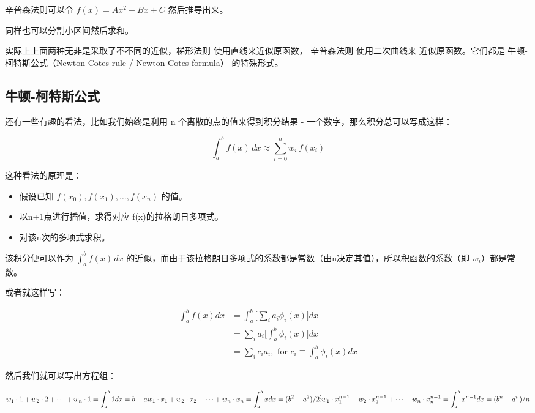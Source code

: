 \documentclass[
]{book}
\providecommand{\tightlist}{%
  \setlength{\itemsep}{0pt}\setlength{\parskip}{0pt}}
\begin{document}
辛普森法则可以令 \(f(x) = A x^2 + Bx + C\) 然后推导出来。

同样也可以分割小区间然后求和。

实际上上面两种无非是采取了不不同的近似，梯形法则 使用直线来近似原函数， 辛普森法则 使用二次曲线来 近似原函数。它们都是 牛顿-柯特斯公式（Newton-Cotes rule / Newton-Cotes formula） 的特殊形式。

\hypertarget{ux725bux987f-ux67efux7279ux65afux516cux5f0f}{%
\subsection{牛顿-柯特斯公式}\label{ux725bux987f-ux67efux7279ux65afux516cux5f0f}}

还有一些有趣的看法，比如我们始终是利用 n 个离散的点的值来得到积分结果 - 一个数字，那么积分总可以写成这样：

\[\int _{a}^{b}f(x)\,dx\approx \sum _{{i=0}}^{n}w_{i}\,f(x_{i})\]

这种看法的原理是：

\begin{itemize}
\tightlist
\item
  假设已知 \(f(x_{0}),f(x_{1}),\dots ,f(x_{n})\) 的值。
\item
  以n+1点进行插值，求得对应 f(x)的拉格朗日多项式。
\item
  对该n次的多项式求积。
\end{itemize}

该积分便可以作为 \(\int _{a}^{b}f(x)\,dx\) 的近似，而由于该拉格朗日多项式的系数都是常数（由n决定其值），所以积函数的系数（即 \(w_{i}\)）都是常数。

或者就这样写：

\[
\begin{aligned}
\int_a^b f(x)dx &= \int_a^b \bigg[ \sum_i a_i \phi_i(x)\bigg] dx  \\
&=\sum_i a_i \bigg[ \int_a^b  \phi_i(x)\bigg] dx\\
&= \sum_i c_i a_i, \text{ for } c_i \equiv \int_a^b \phi_i(x) dx
\end{aligned}
\]

然后我们就可以写出方程组：

\[
w_1 \cdot 1 + w_2 \cdot 2 + \cdots + w_n \cdot 1 = \int_a^b 1dx = b - a \\
w_1 \cdot x_1 + w_2 \cdot x_2 + \cdots + w_n \cdot x_n = \int_a^b xdx = (b^2 - a^2)/2 \\
\vdots \\
w_1 \cdot x_1^{n-1} + w_2 \cdot x_2^{n-1} + \cdots + w_n \cdot x_n^{n-1} = \int_a^b x^{n-1}dx = (b^n - a^n)/n \\
\]
\end{document}

